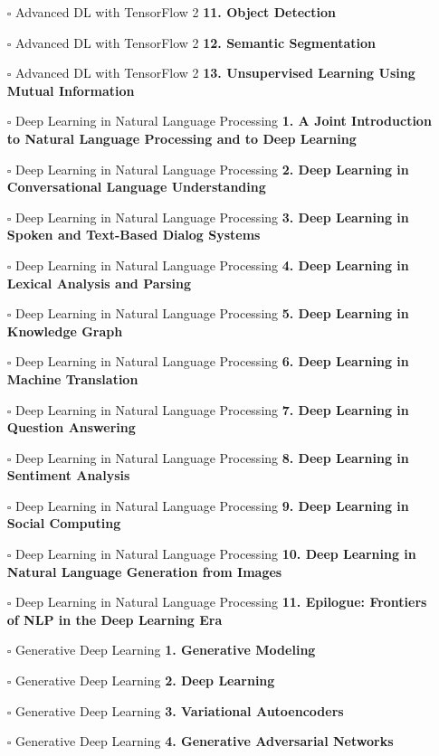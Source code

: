 \documentclass[a4, landscape, 12pt]{article}
\newcommand{\checkbox}{$\square$}%
\begin{document}
\begin{itemize}
{}
\item [\checkbox]  Advanced DL with TensorFlow 2 \textbf{ 11. Object Detection
}
\item [\checkbox]  Advanced DL with TensorFlow 2 \textbf{ 12. Semantic Segmentation
}
\item [\checkbox]  Advanced DL with TensorFlow 2 \textbf{ 13. Unsupervised Learning Using Mutual Information
}
\item [\checkbox]  Deep Learning in Natural Language Processing \textbf{ 1. A Joint Introduction to Natural Language Processing and to Deep Learning
}
\item [\checkbox]  Deep Learning in Natural Language Processing \textbf{ 2. Deep Learning in Conversational Language Understanding
}
\item [\checkbox]  Deep Learning in Natural Language Processing \textbf{ 3. Deep Learning in Spoken and Text-Based Dialog Systems
}
\item [\checkbox]  Deep Learning in Natural Language Processing \textbf{ 4. Deep Learning in Lexical Analysis and Parsing
}
\item [\checkbox]  Deep Learning in Natural Language Processing \textbf{ 5. Deep Learning in Knowledge Graph
}
\item [\checkbox]  Deep Learning in Natural Language Processing \textbf{ 6. Deep Learning in Machine Translation
}
\item [\checkbox]  Deep Learning in Natural Language Processing \textbf{ 7. Deep Learning in Question Answering
}
\item [\checkbox]  Deep Learning in Natural Language Processing \textbf{ 8. Deep Learning in Sentiment Analysis
}
\item [\checkbox]  Deep Learning in Natural Language Processing \textbf{ 9. Deep Learning in Social Computing
}
\item [\checkbox]  Deep Learning in Natural Language Processing \textbf{ 10. Deep Learning in Natural Language Generation from Images
}
\item [\checkbox]  Deep Learning in Natural Language Processing \textbf{ 11. Epilogue: Frontiers of NLP in the Deep Learning Era
}
\item [\checkbox]  Generative Deep Learning \textbf{ 1. Generative Modeling
}
\item [\checkbox]  Generative Deep Learning \textbf{ 2. Deep Learning
}
\item [\checkbox]  Generative Deep Learning \textbf{ 3. Variational Autoencoders
}
\item [\checkbox]  Generative Deep Learning \textbf{ 4. Generative Adversarial Networks
}
\end{itemize}
\end{document}
